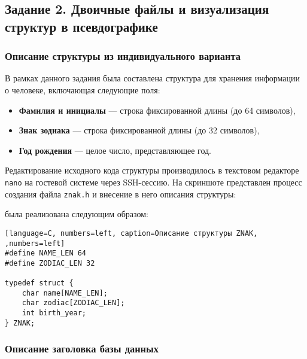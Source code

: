 \subsection{Задание 2. Двоичные файлы и визуализация структур в псевдографике}

\subsubsection{Описание структуры из индивидуального варианта}

В рамках данного задания была составлена структура для хранения информации о человеке, включающая следующие поля:
\begin{itemize}
  \item \textbf{Фамилия и инициалы} --- строка фиксированной длины (до 64 символов),
  \item \textbf{Знак зодиака} --- строка фиксированной длины (до 32 символов),
  \item \textbf{Год рождения} --- целое число, представляющее год.
\end{itemize}

Редактирование исходного кода структуры производилось в текстовом редакторе \texttt{nano} на гостевой системе через SSH-сессию. На скриншоте представлен процесс создания файла \texttt{znak.h} и внесение в него описания структуры:


 была реализована следующим образом:
\begin{lstlisting}[language=C, numbers=left, caption=Описание структуры ZNAK, ,numbers=left]
#define NAME_LEN 64
#define ZODIAC_LEN 32

typedef struct {
    char name[NAME_LEN];
    char zodiac[ZODIAC_LEN];
    int birth_year;
} ZNAK;
\end{lstlisting}

\subsubsection{Описание заголовка базы данных}

